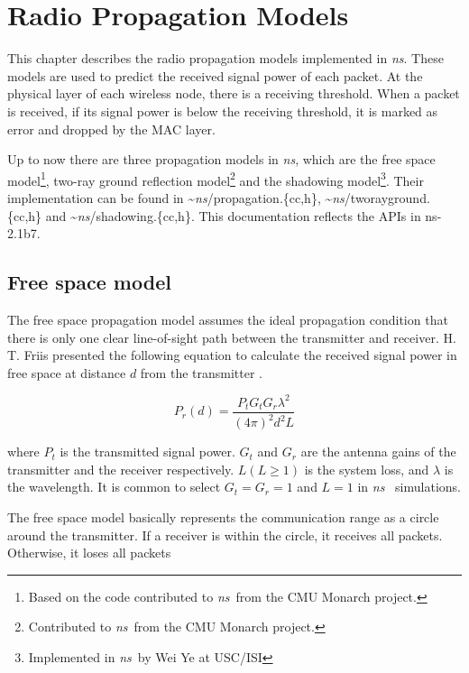 
\chapter{Radio Propagation Models}
\label{chap:propagation}

This chapter describes the radio propagation models implemented in \emph{ns}.
These models are used to predict the received signal power of
each packet. At the physical layer of each wireless node, there is a receiving
threshold. When a packet is received, if its signal power is below the receiving
threshold, it is marked as error and dropped by the MAC layer.

Up to now there are three propagation models in \emph{ns}, which are the free
space model\footnote{Based on the code contributed to \emph{ns}~from the CMU Monarch
project.}, two-ray ground reflection model\footnote{Contributed to \emph{ns}~from the
CMU Monarch project.} and the shadowing model\footnote{Implemented in \emph{ns}~by
Wei Ye at USC/ISI}. Their implementation can be found in \textasciitilde\emph{ns}/{propagation.\{cc,h\}},
\textasciitilde\emph{ns}/{tworayground.\{cc,h\}} and \textasciitilde\emph{ns}/{shadowing.\{cc,h\}}. This documentation
reflects the APIs in ns-2.1b7.

\section{Free space model}
\label{sec:freespace}

The free space propagation model assumes the ideal propagation condition
that there is only one clear line-of-sight path between the transmitter and
receiver. H. T. Friis presented the following equation to
calculate the received signal power in free space at distance $d$ from the
transmitter \cite{Friis46}.

\begin{equation}
  P_r (d) = \frac{P_t G_t G_r \lambda^2}{(4\pi)^2 d^2 L}
  \label{eqn:freespace}
\end{equation}

where $P_t$ is the transmitted signal power. $G_t$ and $G_r$ are the antenna
gains of the transmitter and the receiver respectively. $L (L\ge1)$ is the
system loss, and $\lambda$ is the wavelength. It is common to select
$G_t = G_r = 1$ and $L = 1$ in \emph{ns}~ simulations.

The free space model basically represents the communication range as a circle
around the transmitter. If a receiver is within the circle, it receives all
packets. Otherwise, it loses all packets

